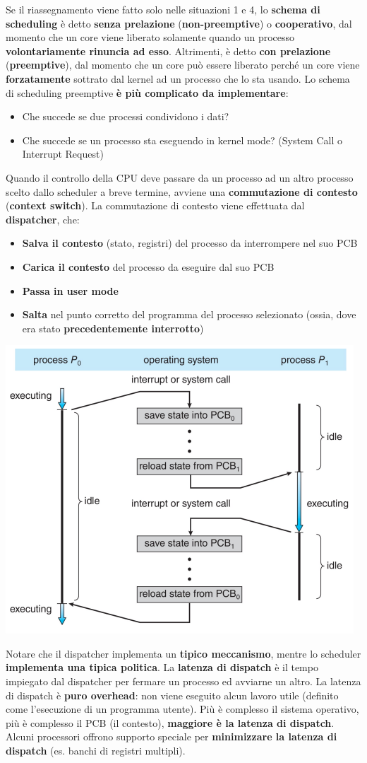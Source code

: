 \documentclass[12pt]{article}
\begin{document}
Se il riassegnamento viene fatto solo nelle situazioni 1 e 4, lo \textbf{schema di scheduling} è detto \textbf{senza prelazione} (\textbf{non-preemptive}) o \textbf{cooperativo}, dal momento che un core viene liberato
solamente quando un processo \textbf{volontariamente rinuncia ad esso}.
Altrimenti, è detto \textbf{con prelazione} (\textbf{preemptive}), dal momento che un core può essere liberato perché un core viene \textbf{forzatamente} sottrato dal kernel ad un processo che lo sta usando.
Lo schema di scheduling preemptive \textbf{è più complicato da implementare}:
\begin{itemize}
    \item Che succede se due processi condividono i dati?
    \item Che succede se un processo sta eseguendo in kernel mode? (System Call o Interrupt Request)
\end{itemize}
Quando il controllo della CPU deve passare da un processo ad un altro processo scelto dallo scheduler a breve termine, avviene una \textbf{commutazione di contesto} (\textbf{context switch}).
La commutazione di contesto viene effettuata dal \textbf{dispatcher}, che:
\begin{itemize}
    \item \textbf{Salva il contesto} (stato, registri) del processo da interrompere nel suo PCB
    \item \textbf{Carica il contesto} del processo da eseguire dal suo PCB
    \item \textbf{Passa in user mode}
    \item \textbf{Salta} nel punto corretto del programma del processo selezionato (ossia, dove era stato \textbf{precedentemente interrotto})
\end{itemize}
\begin{center}
    \includegraphics[width = 0.60\linewidth]{Images/41.png}
\end{center}
Notare che il dispatcher implementa un \textbf{tipico meccanismo}, mentre lo scheduler \textbf{implementa una tipica politica}.
La \textbf{latenza di dispatch} è il tempo impiegato dal dispatcher per fermare un processo ed avviarne un altro. La latenza di dispatch
è \textbf{puro overhead}: non viene eseguito alcun lavoro utile (definito come l'esecuzione di un programma utente).
Più è complesso il sistema operativo, più è complesso il PCB (il contesto), \textbf{maggiore è la latenza di dispatch}.
Alcuni processori offrono supporto speciale per \textbf{minimizzare la latenza di dispatch} (es. banchi di registri multipli).
\end{document}
